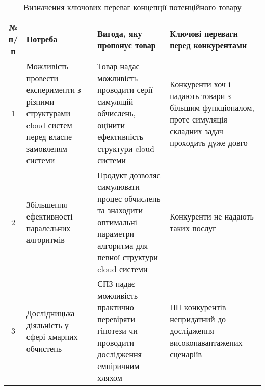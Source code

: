 \begin{table}[H]
	\centering
	\caption{Визначення ключових переваг концепції потенційного товару}
	\begin{tabular}{|c|P{4cm}|P{4cm}|P{4cm}|} \hline
		№ п/п
		& Потреба
		& Вигода, яку пропонує товар
		& Ключові переваги перед конкурентами 
		\\ \hline
		
		1
		& Можливість провести експерименти з різними структурами cloud систем перед власне замовленям системи 
		& Товар надає можливість проводити серії симуляцій обчислень, оцінити ефективність структури cloud системи
		& Конкуренти хоч і надають товари з більшим функціоналом, проте симуляція складних задач проходить дуже довго
		\\ \hline
		
		2
		& Збільшення ефективності паралельних алгоритмів
		& Продукт дозволяє симулювати процес обчислень та знаходити оптимальні параметри алгоритма для певної структури cloud системи
		& Конкуренти не надають таких послуг
		\\ \hline
		
		3
		& Дослідницька діяльність у сфері хмарних обчистень
		& СПЗ надає можливість практично перевіряти гіпотези чи проводити дослідження емпіричним хляхом
		& ПП конкурентів непридатний до дослідження високонавантажених сценаріїв
		\\ \hline
	\end{tabular}
\end{table}

